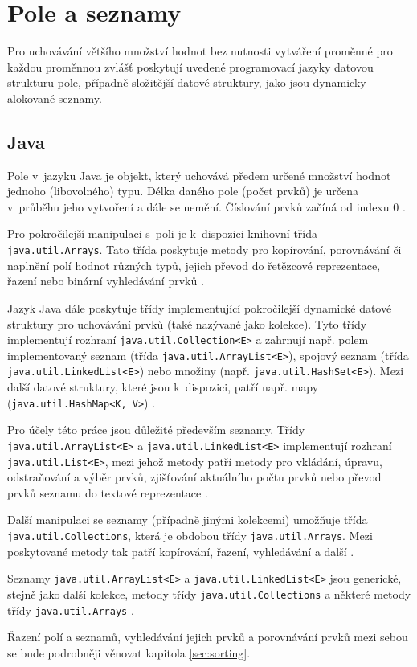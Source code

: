 \documentclass[onepage, a4paper, 12pt]{bakalarka}
\begin{document}
\section{Pole a seznamy}
Pro uchovávání většího množství hodnot bez nutnosti vytváření proměnné pro každou proměnnou zvlášť poskytují uvedené programovací jazyky datovou strukturu pole, případně složitější datové struktury, jako jsou dynamicky alokované seznamy.

\subsection{Java}
Pole v~jazyku Java je objekt, který uchovává předem určené množství hodnot jednoho (libovolného) typu. Délka daného pole (počet prvků) je určena v~průběhu jeho vytvoření a dále se nemění. Číslování prvků začíná od indexu 0 \cite{java-guide-array}.\par
Pro pokročilejší manipulaci s~poli je k~dispozici knihovní třída \texttt{java.util\-.Arrays}. Tato třída poskytuje metody pro kopírování, porovnávání či naplnění polí hodnot různých typů, jejich převod do řetězcové reprezentace, řazení nebo binární vyhledávání prvků \cite{java-guide-arrays}.\par
Jazyk Java dále poskytuje třídy implementující pokročilejší dynamické datové struktury pro uchovávání prvků (také nazývané jako kolekce). Tyto třídy implementují rozhraní \texttt{java.util.Collection<E>} a zahrnují např. polem implementovaný seznam (třída \texttt{java.util.ArrayList<E>}), spojový seznam (třída \texttt{java.util.LinkedList<E>}) nebo množiny (např. \texttt{java.util\-.HashSet<E>}). Mezi další datové struktury, které jsou k~dispozici, patří např. mapy (\texttt{java.util.HashMap<K, V>}) \cite{java-guide-collection, java-guide-arraylist, java-guide-linkedlist, java-guide-hashset, java-guide-hashmap}.\par
Pro účely této práce jsou důležité především seznamy. Třídy \texttt{java.util\-.ArrayList<E>} a \texttt{java.util.LinkedList<E>} implementují rozhraní \texttt{java\-.util.List<E>}, mezi jehož metody patří metody pro vkládání, úpravu, odstraňování a výběr prvků, zjišťování aktuálního počtu prvků nebo převod prvků seznamu do textové reprezentace \cite{java-guide-list, java-guide-arraylist, java-guide-linkedlist}.\par
Další manipulaci se seznamy (případně jinými kolekcemi) umožňuje třída \texttt{java.util.Collections}, která je obdobou třídy \texttt{java.util.Arrays}. Mezi poskytované metody tak patří kopírování, řazení, vyhledávání a další \cite{java-guide-collections}.\par
Seznamy \texttt{java.util.ArrayList<E>} a \texttt{java.util.LinkedList<E>} jsou generické, stejně jako další kolekce, metody třídy \texttt{java.util.Collections} a některé metody třídy \texttt{java.util.Arrays} \cite{java-guide-arraylist, java-guide-linkedlist, java-guide-arrays, java-guide-collections}.\par
Řazení polí a seznamů, vyhledávání jejich prvků a porovnávání prvků mezi sebou se bude podrobněji věnovat kapitola \ref{sec:sorting}.
\end{document}
